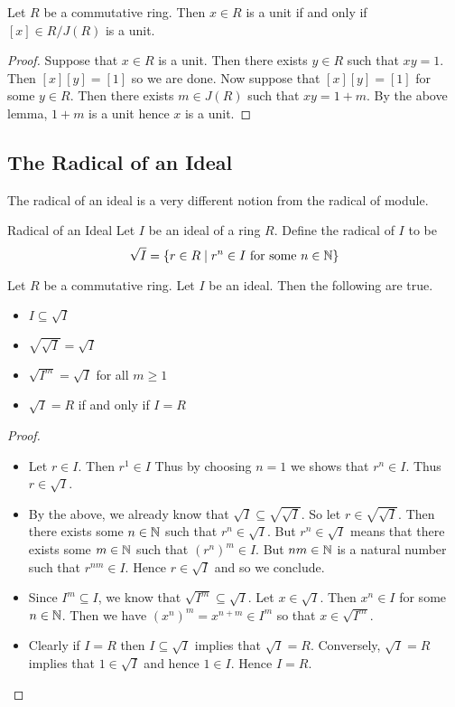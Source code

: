 \documentclass[a4paper]{article}
\begin{document}
\begin{lmm}{}{} Let $R$ be a commutative ring. Then $x\in R$ is a unit if and only if $[x]\in R/J(R)$ is a unit. \tcbline
\begin{proof}
Suppose that $x\in R$ is a unit. Then there exists $y\in R$ such that $xy=1$. Then $[x][y]=[1]$ so we are done. Now suppose that $[x][y]=[1]$ for some $y\in R$. Then there exists $m\in J(R)$ such that $xy=1+m$. By the above lemma, $1+m$ is a unit hence $x$ is a unit. 
\end{proof}
\end{lmm}

\subsection{The Radical of an Ideal}
The radical of an ideal is a very different notion from the radical of module. 

\begin{defn}{Radical of an Ideal}{} Let $I$ be an ideal of a ring $R$. Define the radical of $I$ to be $$\sqrt{I}=\{r\in R\;|\;r^n\in I\text{ for some }n\in\mathbb{N}\}$$
\end{defn}

\begin{prp}{}{} Let $R$ be a commutative ring. Let $I$ be an ideal. Then the following are true. 
\begin{itemize}
\item $I\subseteq\sqrt{I}$
\item $\sqrt{\sqrt{I}}=\sqrt{I}$
\item $\sqrt{I^m}=\sqrt{I}$ for all $m\geq 1$
\item $\sqrt{I}=R$ if and only if $I=R$
\end{itemize} \tcbline
\begin{proof}~\\
\begin{itemize}
\item Let $r\in I$. Then $r^1\in I$ Thus by choosing $n=1$ we shows that $r^n\in I$. Thus $r\in\sqrt{I}$. 
\item By the above, we already know that $\sqrt{I}\subseteq\sqrt{\sqrt{I}}$. So let $r\in\sqrt{\sqrt{I}}$. Then there exists some $n\in\mathbb{N}$ such that $r^n\in\sqrt{I}$. But $r^n\in\sqrt{I}$ means that there exists some $m\in\mathbb{N}$ such that $(r^n)^m\in I$. But $nm\in\mathbb{N}$ is a natural number such that $r^{nm}\in I$. Hence $r\in\sqrt{I}$ and so we conclude. 
\item Since $I^m\subseteq I$, we know that $\sqrt{I^m}\subseteq\sqrt{I}$. Let $x\in\sqrt{I}$. Then $x^n\in I$ for some $n\in\mathbb{N}$. Then we have $(x^n)^m=x^{n+m}\in I^m$ so that $x\in\sqrt{I^m}$. 
\item Clearly if $I=R$ then $I\subseteq\sqrt{I}$ implies that $\sqrt{I}=R$. Conversely, $\sqrt{I}=R$ implies that $1\in\sqrt{I}$ and hence $1\in I$. Hence $I=R$. 
\end{itemize}
\end{proof}
\end{prp}
\end{document}
